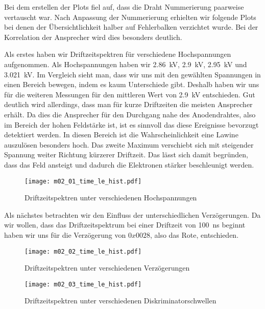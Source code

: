 \documentclass[11pt, ngerman, fleqn, DIV=15, headinclude, BCOR=2cm]{scrreprt}
\begin{document}
Bei dem erstellen der Plots fiel auf, dass die Draht Nummerierung paarweise
vertauscht war.
Nach Anpassung der Nummerierung erhielten wir folgende Plots bei denen der Übersichtlichkeit halber auf Fehlerbalken
verzichtet wurde. 
Bei der Korrelation der Ansprecher wird dies besonders deutlich.

Als erstes haben wir Driftzeitspektren für verschiedene Hochspannungen
aufgenommen.
Als Hochspannungen haben wir \SI{2,86}{\kilo\volt},
\SI{2,9}{\kilo\volt}, \SI{2,95}{\kilo\volt} und \SI{3,021}{\kilo\volt}.
Im Vergleich sieht man, dass wir uns mit den gewählten Spannungen in einen
Bereich bewegen, indem es kaum Unterschiede gibt.
Deshalb haben wir uns für die weiteren Messungen für den mittleren Wert von
\SI{2,9}{\kilo\volt} entschieden.
Gut deutlich wird allerdings, dass man für kurze Driftzeiten die meisten
Ansprecher erhält. Da dies die Ansprecher für den Durchgang nahe des
Anodendrahtes, also im Bereich der hohen Feldstärke ist, ist es sinnvoll das
diese Ereignisse bevorzugt detektiert werden.
In diesen Bereich ist die Wahrscheinlichkeit eine Lawine auszulösen
besonders hoch.
Das zweite Maximum verschiebt sich mit steigender Spannung
weiter Richtung kürzerer Driftzeit. Das lässt sich damit begründen, dass das
Feld ansteigt und dadurch die Elektronen stärker beschleunigt werden.

\begin{figure}
    \centering
    \texttt{[image: m02\_01\_time\_le\_hist.pdf]}
    \caption{%
	    Driftzeitspektren unter verschiedenen Hochspannungen
   }
    \label{fig:m02_01_driftzeitspektrum}
\end{figure}

Als nächstes betrachten wir den Einfluss der unterschiedlichen Verzögerungen.
Da wir wollen, dass das Driftzeitspektrum bei einer Driftzeit von
\SI{100}{\nano\second} beginnt haben wir uns für die Verzögerung von
$0x0028$, also das Rote, entschieden.

\begin{figure}
    \centering
    \texttt{[image: m02\_02\_time\_le\_hist.pdf]}
    \caption{%
	    Driftzeitspektren unter verschiedenen Verzögerungen
   }
    \label{fig:m02_02_driftzeitspektrum}
\end{figure}


\begin{figure}
    \centering
    \texttt{[image: m02\_03\_time\_le\_hist.pdf]}
    \caption{%
	    Driftzeitspektren unter verschiedenen Diskriminatorschwellen
   }
    \label{fig:m02_03_driftzeitspektrum}
\end{figure}
\end{document}
